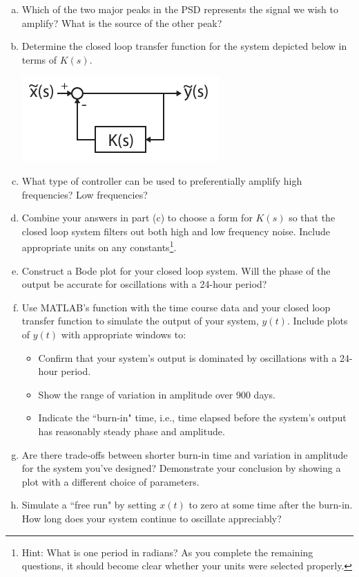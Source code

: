 \documentclass{article}
\begin{document}
\begin{enumerate}[a)]
\setlength{\itemsep}{0pt}
\item Which of the two major peaks in the PSD represents the signal we wish to amplify? What is the source of the other peak?
\item Determine the closed loop transfer function for the system depicted below in terms of $K(s)$.

\begin{center}
\includegraphics[width=.3\textwidth]{feedback.pdf}
\end{center}


\item What type of controller can be used to preferentially amplify high frequencies? Low frequencies?
\item Combine your answers in part (c) to choose a  form for $K(s)$ so that the closed loop system filters out both high and low frequency noise. Include appropriate units on any constants\footnote{Hint: What is one period in radians? As you complete the remaining questions, it should become clear whether your units were selected properly.}.
\item Construct a Bode plot for your closed loop system. Will the phase of the output be accurate for oscillations with a 24-hour period? \pagebreak
\item Use MATLAB's  function with the time course data and your closed loop transfer function to simulate the output of your system, $y(t)$. Include plots of $y(t)$ with appropriate windows to:
\begin{itemize}
\item Confirm that your system's output is dominated by oscillations with a 24-hour period.
\item Show the range of variation in amplitude over 900 days.
\item Indicate the ``burn-in" time, i.e., time elapsed before the system's output has reasonably steady phase and amplitude.
\end{itemize} 
\item Are there trade-offs between shorter burn-in time and variation in amplitude for the system you've designed? Demonstrate your conclusion by showing a plot with a different choice of parameters.
\item Simulate a ``free run" by setting $x(t)$ to zero at some time after the burn-in. How long does your system continue to oscillate appreciably?
\end{enumerate}
\end{document}
